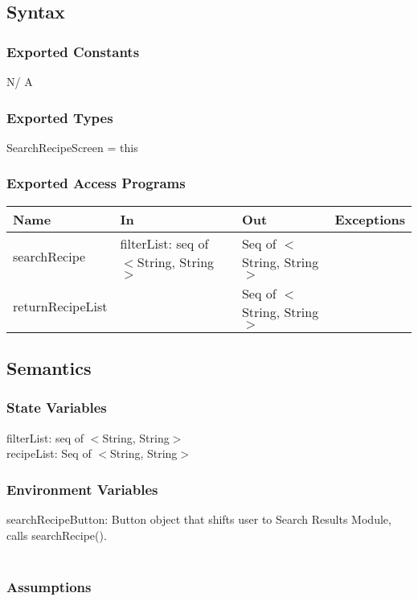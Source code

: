 \documentclass[12pt, titlepage]{article}
\begin{document}
\subsection{Syntax}

\subsubsection{Exported Constants}
N/ A
\subsubsection{Exported Types}
SearchRecipeScreen = this

\subsubsection{Exported Access Programs}

\begin{tabular}{| l | l | l | l |}
	\hline
	{\textbf{Name}} & {\textbf{In}} & {\textbf{Out}} & {\textbf{Exceptions}}\\
	\hline
	{searchRecipe} &filterList: seq of $<$String, String$>$ &Seq of  $<$String, String$>$ &\\
	\hline
	{returnRecipeList} &&Seq of  $<$String, String$>$ &\\
	\hline
\end{tabular}

\subsection{Semantics}

\subsubsection{State Variables}
filterList: seq of $<$String, String$>$\\
recipeList: Seq of  $<$String, String$>$\\

\subsubsection{Environment Variables}

searchRecipeButton: Button object that shifts user to Search Results Module, calls searchRecipe().\\\\

\subsubsection{Assumptions}
\end{document}
